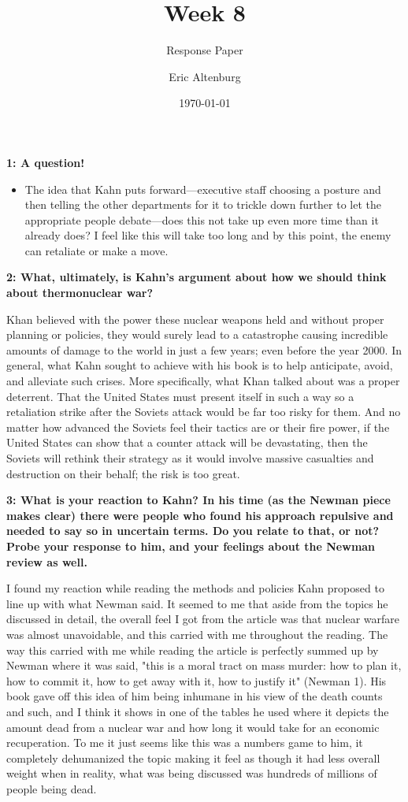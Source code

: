 \documentclass[12pt]{turabian-researchpaper}
\title{Week 8}
\subtitle{Response Paper}
\author{Eric Altenburg}
\date{\today}
\newcommand\question[2]{\noindent\textbf{#1: #2}}
\begin{document}
\maketitle

\question{1}{A question!}

	\begin{itemize}
		\item The idea that Kahn puts forward—executive staff choosing a posture and then telling the other departments for it to trickle down further to let the appropriate people debate—does this not take up even more time than it already does? I feel like this will take too long and by this point, the enemy can retaliate or make a move.
	\end{itemize}

\question{2}{What, ultimately, is Kahn's argument about how we should think about thermonuclear war?}
	
	Khan believed with the power these nuclear weapons held and without proper planning or policies, they would surely lead to a catastrophe causing incredible amounts of damage to the world in just a few years; even before the year 2000. In general, what Kahn sought to achieve with his book is to help anticipate, avoid, and alleviate such crises. More specifically, what Khan talked about was a proper deterrent. That the United States must present itself in such a way so a retaliation strike after the Soviets attack would be far too risky for them. And no matter how advanced the Soviets feel their tactics are or their fire power, if the United States can show that a counter attack will be devastating, then the Soviets will rethink their strategy as it would involve massive casualties and destruction on their behalf; the risk is too great.

\question{3}{What is your reaction to Kahn? In his time (as the Newman piece makes clear) there were people who found his approach repulsive and needed to say so in uncertain terms. Do you relate to that, or not? Probe your response to him, and your feelings about the Newman review as well.}

	I found my reaction while reading the methods and policies Kahn proposed to line up with what Newman said. It seemed to me that aside from the topics he discussed in detail, the overall feel I got from the article was that nuclear warfare was almost unavoidable, and this carried with me throughout the reading. The way this carried with me while reading the article is perfectly summed up by Newman where it was said, "this is a moral tract on mass murder: how to plan it, how to commit it, how to get away with it, how to justify it" (Newman 1). His book gave off this idea of him being inhumane in his view of the death counts and such, and I think it shows in one of the tables he used where it depicts the amount dead from a nuclear war and how long it would take for an economic recuperation. To me it just seems like this was a numbers game to him, it completely dehumanized the topic making it feel as though it had less overall weight when in reality, what was being discussed was hundreds of millions of people being dead.
\end{document}
